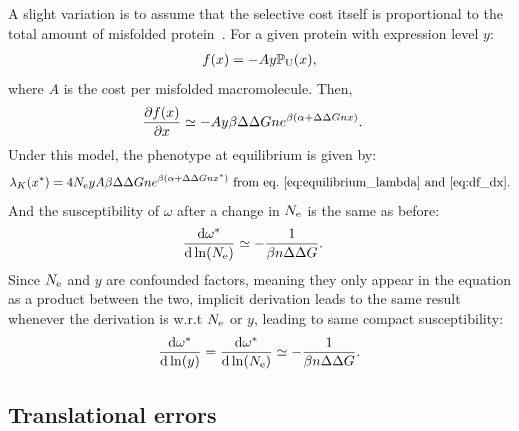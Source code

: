 A slight variation is to assume that the selective cost itself is proportional to the total amount of misfolded protein~\citep{Drummond2005a, Wilke2006, Drummond2008, Serohijos2012}. For a given protein with expression level $y$:
\begin{align}
    f (x) = - A y \mathbb{P}_{\text{U}} (x),
\end{align}
where $A$ is the cost per misfolded macromolecule.
Then,
\begin{align}
    \frac{\partial  f (x)}{\partial x} & \simeq -A y \beta \Delta \Delta G n e^{\beta(\alpha + \Delta \Delta G n x)}.
\end{align}
Under this model, the phenotype at equilibrium is given by:
\begin{align}
    \lambda_{K}(x^{*}) = 4N_{\text{e}} y A \beta \Delta \Delta G n e^{\beta(\alpha + \Delta \Delta G n x^{*})} \text{ from eq.~\ref{eq:equilibrium_lambda} and~\ref{eq:df_dx}}.
\end{align}
And the susceptibility of $\omega$ after a change in $N_{\text{e}}$ is the same as before:
\begin{align}
    \frac{ \text{d} \omega^{*}}{\text{d} \ln (N_{\text{e}})} & \simeq - \frac{1}{\beta n \Delta \Delta G}.
\end{align}
Since $N_{\text{e}}$ and $y$ are confounded factors, meaning they only appear in the equation as a product between the two, implicit derivation leads to the same result whenever the derivation is w.r.t $N_{\text{e}}$ or $y$, leading to same compact susceptibility:
\begin{align}
    \frac{ \text{d} \omega^{*}}{\text{d} \ln (y)} = \frac{ \text{d} \omega^{*}}{\text{d} \ln (N_{\text{e}})} \simeq - \frac{1}{\beta n \Delta \Delta G}.
\end{align}

\subsection{Translational errors}
\label{subsec:translational-errors}

